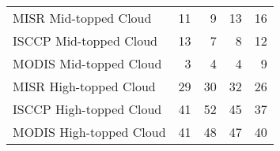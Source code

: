 \begin{tabular}{lrrrr}
   MISR Mid-topped Cloud &                       11 &                        9 &                       13 &                       16 \\
  ISCCP Mid-topped Cloud &                       13 &                        7 &                        8 &                       12 \\
  MODIS Mid-topped Cloud &                        3 &                        4 &                        4 &                        9 \\
  MISR High-topped Cloud &                       29 &                       30 &                       32 &                       26 \\
 ISCCP High-topped Cloud &                       41 &                       52 &                       45 &                       37 \\
 MODIS High-topped Cloud &                       41 &                       48 &                       47 &                       40 \\ \hline
\end{tabular}
